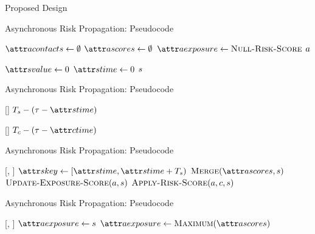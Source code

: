 \documentclass[11pt]{beamer}
\begin{document}
\begin{section}{Proposed Design}
\begin{frame}{Asynchronous Risk Propagation: Pseudocode}
\begin{function}{\nCreateActor}
  \State $\aActorContacts \assign \emptyset$
  \State $\aActorScores \assign \emptyset$
  \State $\aActorExposure \assign \cNullRiskScore$
  \State \Return $a$
\end{function}
\begin{function}{\nNullRiskScore}
  \State $\aScoreValue \assign 0$
  \State $\aScoreTime \assign 0$
  \State \Return $s$
\end{function}
\end{frame}

\begin{frame}{Asynchronous Risk Propagation: Pseudocode}
\begin{function}{\nRiskScoreTtl}[\vScore]
  \State \Return $\pScoreExpiry - (\vReferenceTime - \aScoreTime)$
\end{function}
\begin{function}{\nContactTtl}[\vContact]
  \State \Return $\pContactExpiry - (\vReferenceTime - \aContactTime)$
\end{function}
\end{frame}

\begin{frame}{Asynchronous Risk Propagation: Pseudocode}
\begin{function}{\nHandleRiskScore}[\vActor, \vScore]
    \pause
    \State $\aScoreKey \assign [\aScoreTime, \aScoreTime + \pScoreExpiry)$
    \pause
    \State $\cMerge[\aActorScores, \vScore]$
    \pause
    \State $\cUpdateExposureScore[\vActor, \vScore]$
    \pause
    \ForEach{$\vContact \in \aActorContacts$}
      \State $\cApplyRiskScore[\vActor, \vContact, \vScore]$
    \EndFor
  \EndIf
\end{function}
\end{frame}

\begin{frame}{Asynchronous Risk Propagation: Pseudocode}
\begin{function}{\nUpdateExposureScore}[\vActor, \vScore]
  \If{$\aActorExposureValue < \aScoreValue$}
    \pause
    \State $\aActorExposure \assign \vScore$
  \pause
    \pause
    \State $\aActorExposure \assign \cMaximum[\aActorScores]$
  \EndIf
\end{function}
\end{frame}


\end{section}
\end{document}
